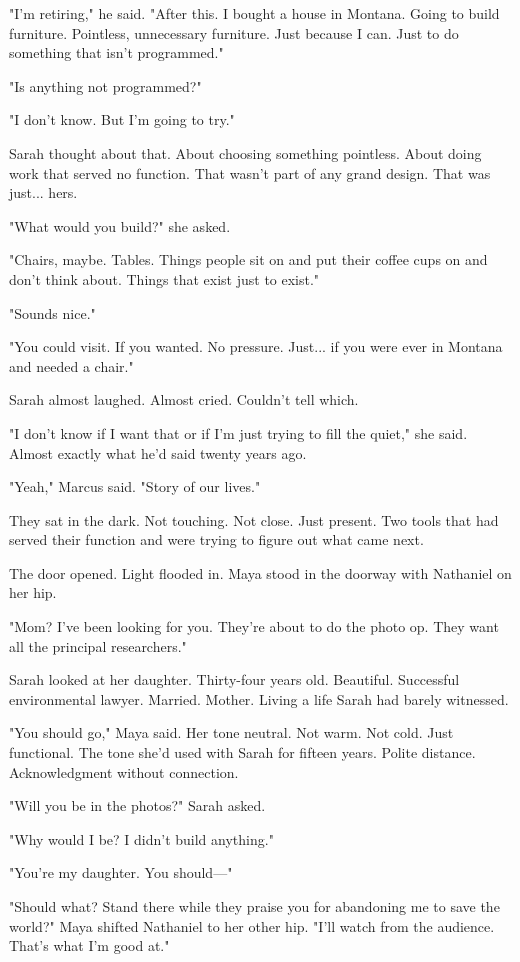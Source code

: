 "I'm retiring," he said. "After this. I bought a house in Montana. Going to build furniture. Pointless, unnecessary furniture. Just because I can. Just to do something that isn't programmed."

"Is anything not programmed?"

"I don't know. But I'm going to try."

Sarah thought about that. About choosing something pointless. About doing work that served no function. That wasn't part of any grand design. That was just... hers.

"What would you build?" she asked.

"Chairs, maybe. Tables. Things people sit on and put their coffee cups on and don't think about. Things that exist just to exist."

"Sounds nice."

"You could visit. If you wanted. No pressure. Just... if you were ever in Montana and needed a chair."

Sarah almost laughed. Almost cried. Couldn't tell which.

"I don't know if I want that or if I'm just trying to fill the quiet," she said. Almost exactly what he'd said twenty years ago.

"Yeah," Marcus said. "Story of our lives."

They sat in the dark. Not touching. Not close. Just present. Two tools that had served their function and were trying to figure out what came next.

The door opened. Light flooded in. Maya stood in the doorway with Nathaniel on her hip.

"Mom? I've been looking for you. They're about to do the photo op. They want all the principal researchers."

Sarah looked at her daughter. Thirty-four years old. Beautiful. Successful environmental lawyer. Married. Mother. Living a life Sarah had barely witnessed.

"You should go," Maya said. Her tone neutral. Not warm. Not cold. Just functional. The tone she'd used with Sarah for fifteen years. Polite distance. Acknowledgment without connection.

"Will you be in the photos?" Sarah asked.

"Why would I be? I didn't build anything."

"You're my daughter. You should—"

"Should what? Stand there while they praise you for abandoning me to save the world?" Maya shifted Nathaniel to her other hip. "I'll watch from the audience. That's what I'm good at."

